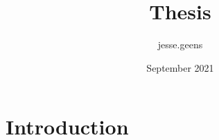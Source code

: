 \documentclass{article}
\title{Thesis}
\author{jesse.geens }
\date{September 2021}
\begin{document}
\maketitle

\section{Introduction}
\end{document}
